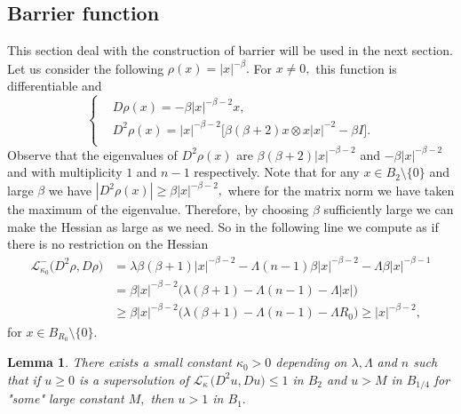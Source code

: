 \documentclass{amsart}
\theoremstyle{plain}
\newtheorem{lemma}[theorem]{Lemma}
\numberwithin{equation}{section}
\begin{document}
\subsection{Barrier function}
This section deal with the construction of barrier will be used in the next section. Let us consider the following $\rho(x)=|x|^{-\beta}.$ For $x\not=0,$ this function is differentiable and 
\begin{equation*}
\left\{
\begin{aligned}
&D\rho(x)=-\beta|x|^{-\beta-2}x,\\ 
&D^{2}\rho(x)=|x|^{-\beta-2}\Big[\beta(\beta+2)x\otimes x|x|^{-2}-\beta I\Big].\\
\end{aligned}
\right.
\end{equation*}
Observe that the eigenvalues of $D^{2}\rho(x)$ are $\beta(\beta+2)|x|^{-\beta-2}$ and $-\beta|x|^{-\beta-2}$ and  with multiplicity $1$ and $n-1$ respectively. Note that for any $x\in B_{2}\setminus\{0\}$ and large $\beta$  we have $|D^{2}\rho(x)|\geq\beta|x|^{-\beta-2},$ where for the matrix norm we have taken the maximum of the eigenvalue. Therefore, by choosing $\beta$ sufficiently large we can make the Hessian as large as we need. So in the following line we compute as if there is no restriction on the Hessian 
\begin{equation*}
\begin{aligned}
\mathcal{L}_{\kappa_{0}}^{-}\big(D^{2}\rho,D\rho\big)&=\lambda\beta(\beta+1)|x|^{-\beta-2}-\Lambda(n-1)\beta |x|^{-\beta-2}-\Lambda\beta|x|^{-\beta-1}\\
&=\beta|x|^{-\beta-2}\Big(\lambda(\beta+1)-\Lambda(n-1)-\Lambda|x|\Big)\\
&\geq\beta |x|^{-\beta-2}\Big(\lambda(\beta+1)-\Lambda(n-1)-\Lambda R_{0}\Big)
\geq |x|^{-\beta-2},
\end{aligned} 
\end{equation*}
for $x\in B_{R_{0}}\setminus\{0\}.$
\begin{lemma}\label{com}
There exists a small constant $\kappa_{0}>0$ depending on $\lambda,\Lambda$ and $n$ such that if $u\geq0$ is a supersolution of $\mathcal{L}_{\kappa}^{-}\big(D^{2}u,Du\big)\leq 1$ in $B_{2}$ and $u>M$ in $B_{1/4}$ for "some" large constant $M,$ then $u>1$ in $B_{1}.$ 
\end{lemma}
\end{document}
